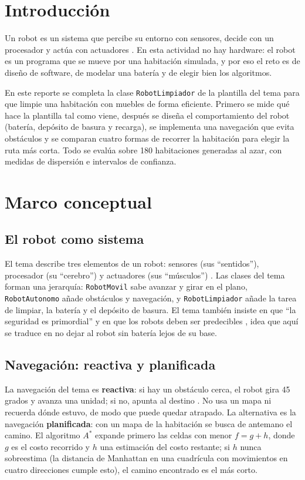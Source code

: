 \documentclass[11pt,letterpaper]{article}
\begin{document}
\portada
\indicegeneral

\section{Introducción}

Un robot es un sistema que percibe su entorno con sensores, decide con un procesador y actúa con actuadores \parencite{iae_u4_t46}. En esta actividad no hay hardware: el robot es un programa que se mueve por una habitación simulada, y por eso el reto es de diseño de software, de modelar una batería y de elegir bien los algoritmos.

En este reporte se completa la clase \texttt{RobotLimpiador} de la plantilla del tema para que limpie una habitación con muebles de forma eficiente. Primero se mide qué hace la plantilla tal como viene, después se diseña el comportamiento del robot (batería, depósito de basura y recarga), se implementa una navegación que evita obstáculos y se comparan cuatro formas de recorrer la habitación para elegir la ruta más corta. Todo se evalúa sobre 180 habitaciones generadas al azar, con medidas de dispersión e intervalos de confianza.

\section{Marco conceptual}

\subsection{El robot como sistema}

El tema describe tres elementos de un robot: sensores (sus ``sentidos''), procesador (su ``cerebro'') y actuadores (sus ``músculos'') \parencite{iae_u4_t46}. Las clases del tema forman una jerarquía: \texttt{RobotMovil} sabe avanzar y girar en el plano, \texttt{RobotAutonomo} añade obstáculos y navegación, y \texttt{RobotLimpiador} añade la tarea de limpiar, la batería y el depósito de basura. El tema también insiste en que ``la seguridad es primordial'' y en que los robots deben ser predecibles \parencite{iae_u4_t46}, idea que aquí se traduce en no dejar al robot sin batería lejos de su base.

\subsection{Navegación: reactiva y planificada}

La navegación del tema es \textbf{reactiva}: si hay un obstáculo cerca, el robot gira 45 grados y avanza una unidad; si no, apunta al destino \parencite{iae_u4_t46}. No usa un mapa ni recuerda dónde estuvo, de modo que puede quedar atrapado. La alternativa es la navegación \textbf{planificada}: con un mapa de la habitación se busca de antemano el camino. El algoritmo $A^*$ expande primero las celdas con menor $f = g + h$, donde $g$ es el costo recorrido y $h$ una estimación del costo restante; si $h$ nunca sobreestima (la distancia de Manhattan en una cuadrícula con movimientos en cuatro direcciones cumple esto), el camino encontrado es el más corto.
\end{document}
